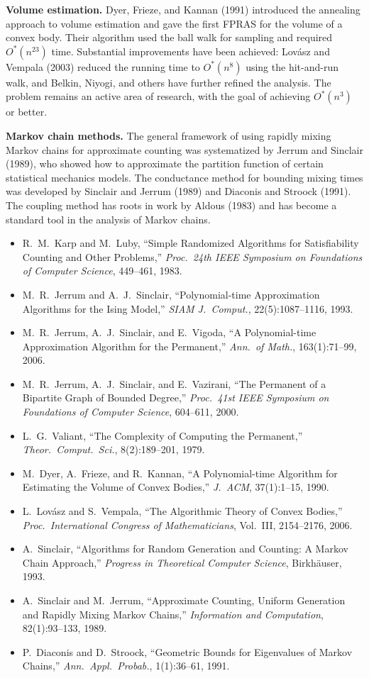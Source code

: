 \documentclass[twoside,12pt]{book}
\theoremstyle{plain}
\theoremstyle{definition}
\theoremstyle{remark}
\begin{document}
\textbf{Volume estimation.} Dyer, Frieze, and Kannan (1991) introduced the annealing approach to volume estimation and gave the first FPRAS for the volume of a convex body. Their algorithm used the ball walk for sampling and required $O^*(n^{23})$ time. Substantial improvements have been achieved: Lov\'{a}sz and Vempala (2003) reduced the running time to $O^*(n^8)$ using the hit-and-run walk, and Belkin, Niyogi, and others have further refined the analysis. The problem remains an active area of research, with the goal of achieving $O^*(n^3)$ or better.

\textbf{Markov chain methods.} The general framework of using rapidly mixing Markov chains for approximate counting was systematized by Jerrum and Sinclair (1989), who showed how to approximate the partition function of certain statistical mechanics models. The conductance method for bounding mixing times was developed by Sinclair and Jerrum (1989) and Diaconis and Stroock (1991). The coupling method has roots in work by Aldous (1983) and has become a standard tool in the analysis of Markov chains.

\begin{itemize}[nosep]
    \item R.~M.~Karp and M.~Luby, ``Simple Randomized Algorithms for Satisfiability Counting and Other Problems,'' \textit{Proc.\ 24th IEEE Symposium on Foundations of Computer Science}, 449--461, 1983.
    \item M.~R.~Jerrum and A.~J.~Sinclair, ``Polynomial-time Approximation Algorithms for the Ising Model,'' \textit{SIAM J.\ Comput.}, 22(5):1087--1116, 1993.
    \item M.~R.~Jerrum, A.~J.~Sinclair, and E.~Vigoda, ``A Polynomial-time Approximation Algorithm for the Permanent,'' \textit{Ann.\ of Math.}, 163(1):71--99, 2006.
    \item M.~R.~Jerrum, A.~J.~Sinclair, and E.~Vazirani, ``The Permanent of a Bipartite Graph of Bounded Degree,'' \textit{Proc.\ 41st IEEE Symposium on Foundations of Computer Science}, 604--611, 2000.
    \item L.~G.~Valiant, ``The Complexity of Computing the Permanent,'' \textit{Theor.\ Comput.\ Sci.}, 8(2):189--201, 1979.
    \item M.~Dyer, A.~Frieze, and R.~Kannan, ``A Polynomial-time Algorithm for Estimating the Volume of Convex Bodies,'' \textit{J.\ ACM}, 37(1):1--15, 1990.
    \item L.~Lov\'{a}sz and S.~Vempala, ``The Algorithmic Theory of Convex Bodies,'' \textit{Proc.\ International Congress of Mathematicians}, Vol.\ III, 2154--2176, 2006.
    \item A.~Sinclair, ``Algorithms for Random Generation and Counting: A Markov Chain Approach,'' \textit{Progress in Theoretical Computer Science}, Birkh\"{a}user, 1993.
    \item A.~Sinclair and M.~Jerrum, ``Approximate Counting, Uniform Generation and Rapidly Mixing Markov Chains,'' \textit{Information and Computation}, 82(1):93--133, 1989.
    \item P.~Diaconis and D.~Stroock, ``Geometric Bounds for Eigenvalues of Markov Chains,'' \textit{Ann.\ Appl.\ Probab.}, 1(1):36--61, 1991.
\end{itemize}
\end{document}
